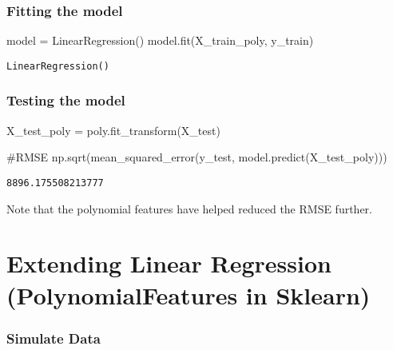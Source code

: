\documentclass[
  letterpaper,
  DIV=11,
  numbers=noendperiod]{scrreprt}
\newenvironment{Shaded}{\begin{snugshade}}{\end{snugshade}}
\newcommand{\CommentTok}[1]{\textcolor[rgb]{0.37,0.37,0.37}{#1}}
\newcommand{\NormalTok}[1]{\textcolor[rgb]{0.00,0.23,0.31}{#1}}
\newcommand{\OperatorTok}[1]{\textcolor[rgb]{0.37,0.37,0.37}{#1}}
\begin{document}
\subsection{Fitting the model}\label{fitting-the-model}

\begin{Shaded}
\begin{Highlighting}[]
\NormalTok{model }\OperatorTok{=}\NormalTok{ LinearRegression() }
\NormalTok{model.fit(X\_train\_poly, y\_train) }
\end{Highlighting}
\end{Shaded}

\begin{verbatim}
LinearRegression()
\end{verbatim}

\subsection{Testing the model}\label{testing-the-model}

\begin{Shaded}
\begin{Highlighting}[]
\NormalTok{X\_test\_poly }\OperatorTok{=}\NormalTok{ poly.fit\_transform(X\_test)}
\end{Highlighting}
\end{Shaded}

\begin{Shaded}
\begin{Highlighting}[]
\CommentTok{\#RMSE}
\NormalTok{np.sqrt(mean\_squared\_error(y\_test, model.predict(X\_test\_poly)))}
\end{Highlighting}
\end{Shaded}

\begin{verbatim}
8896.175508213777
\end{verbatim}

Note that the polynomial features have helped reduced the RMSE further.


\chapter{Extending Linear Regression (PolynomialFeatures in
Sklearn)}\label{extending-linear-regression-polynomialfeatures-in-sklearn}

\subsection{Simulate Data}\label{simulate-data}
\end{document}

